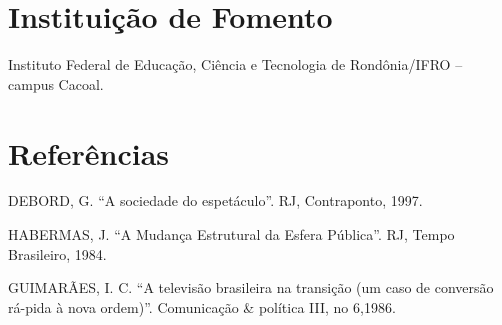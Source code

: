 \documentclass[article,12pt,onesidea,4paper,english,brazil]{abntex2}
\begin{document}
	
	\section*{Instituição de Fomento}
	
Instituto Federal de Educação, Ciência e Tecnologia de Rondônia/IFRO – campus
Cacoal.

	
	\section*{Referências}
	
	\noindent DEBORD, G. “A sociedade do espetáculo”. RJ, Contraponto, 1997.
	
	\noindent HABERMAS, J. “A Mudança Estrutural da Esfera Pública”. RJ, Tempo Brasileiro, 1984. 
	
	\noindent GUIMARÃES, I. C. “A televisão brasileira na transição (um caso de conversão rá-pida à nova ordem)”. Comunicação \& política III, no 6,1986.
	
	
\end{document}
